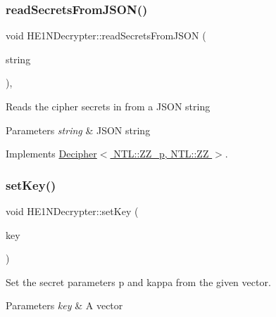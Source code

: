 \mbox{\label{classHE1NDecrypter_a323f074a37cb4ebfbcfca4b6bdfb6737}} 
\subsubsection{\texorpdfstring{read\+Secrets\+From\+J\+S\+O\+N()}{readSecretsFromJSON()}}
{\footnotesize\ttfamily void H\+E1\+N\+Decrypter\+::read\+Secrets\+From\+J\+S\+ON (\begin{DoxyParamCaption}\item[{std\+::string \&}]{string }\end{DoxyParamCaption})\hspace{0.3cm}{\ttfamily [override]}, {\ttfamily [virtual]}}

Reads the cipher secrets in from a J\+S\+ON string 
\begin{DoxyParams}{Parameters}
{\em string} & J\+S\+ON string \\
\hline
\end{DoxyParams}


Implements \hyperlink{classDecipher_a39aea002012130201e12a8fa7d84dda5}{Decipher$<$ N\+T\+L\+::\+Z\+Z\+\_\+p, N\+T\+L\+::\+Z\+Z $>$}.

\mbox{\label{classHE1NDecrypter_a35a7d0c2ce869f417d6dc90792e61e11}} 
\subsubsection{\texorpdfstring{set\+Key()}{setKey()}}
{\footnotesize\ttfamily void H\+E1\+N\+Decrypter\+::set\+Key (\begin{DoxyParamCaption}\item[{N\+T\+L\+::vec\+\_\+\+ZZ \&}]{key }\end{DoxyParamCaption})}

Set the secret parameters {\ttfamily p} and {\ttfamily kappa} from the given vector. 
\begin{DoxyParams}{Parameters}
{\em key} & A vector \\
\hline
\end{DoxyParams}


